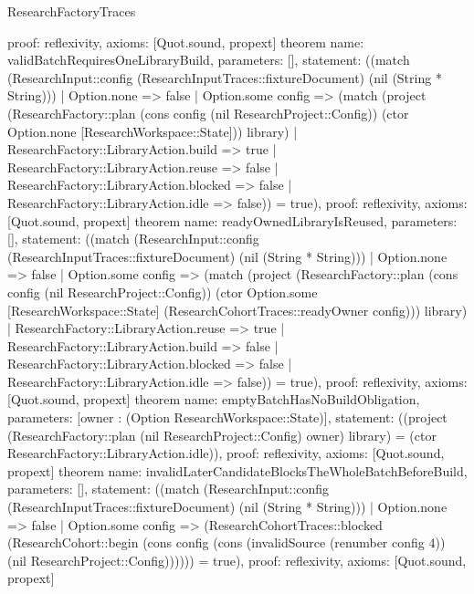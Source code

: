 \begin{lexlean}{ResearchFactoryTraces}
\begin{semanticmodule}
{ proof: reflexivity{},
 axioms: [Quot.sound, propext]
}
theorem{
 name: validBatchRequiresOneLibraryBuild,
 parameters: [],
 statement: ((match (ResearchInput::config (ResearchInputTraces::fixtureDocument) (nil (String * String))) | Option.none => false | Option.some config => (match (project (ResearchFactory::plan (cons config (nil ResearchProject::Config)) (ctor Option.none [ResearchWorkspace::State])) library) | ResearchFactory::LibraryAction.build => true | ResearchFactory::LibraryAction.reuse => false | ResearchFactory::LibraryAction.blocked => false | ResearchFactory::LibraryAction.idle => false)) = true),
 proof: reflexivity{},
 axioms: [Quot.sound, propext]
}
theorem{
 name: readyOwnedLibraryIsReused,
 parameters: [],
 statement: ((match (ResearchInput::config (ResearchInputTraces::fixtureDocument) (nil (String * String))) | Option.none => false | Option.some config => (match (project (ResearchFactory::plan (cons config (nil ResearchProject::Config)) (ctor Option.some [ResearchWorkspace::State] (ResearchCohortTraces::readyOwner config))) library) | ResearchFactory::LibraryAction.reuse => true | ResearchFactory::LibraryAction.build => false | ResearchFactory::LibraryAction.blocked => false | ResearchFactory::LibraryAction.idle => false)) = true),
 proof: reflexivity{},
 axioms: [Quot.sound, propext]
}
theorem{
 name: emptyBatchHasNoBuildObligation,
 parameters: [owner : (Option ResearchWorkspace::State)],
 statement: ((project (ResearchFactory::plan (nil ResearchProject::Config) owner) library) = (ctor ResearchFactory::LibraryAction.idle)),
 proof: reflexivity{},
 axioms: [Quot.sound, propext]
}
theorem{
 name: invalidLaterCandidateBlocksTheWholeBatchBeforeBuild,
 parameters: [],
 statement: ((match (ResearchInput::config (ResearchInputTraces::fixtureDocument) (nil (String * String))) | Option.none => false | Option.some config => (ResearchCohortTraces::blocked (ResearchCohort::begin (cons config (cons (invalidSource (renumber config 4)) (nil ResearchProject::Config)))))) = true),
 proof: reflexivity{},
 axioms: [Quot.sound, propext]
}
\end{semanticmodule}
\end{lexlean}
